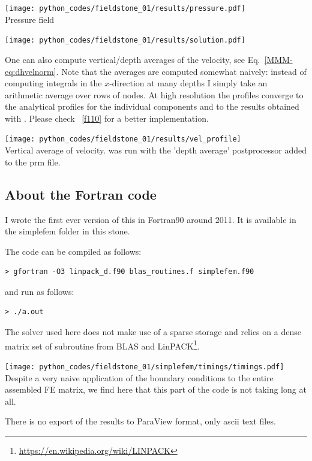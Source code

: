 \begin{center}
\texttt{[image: python\_codes/fieldstone\_01/results/pressure.pdf]}\\
{\captionfont Pressure field}
\end{center}

\begin{center}
\texttt{[image: python\_codes/fieldstone\_01/results/solution.pdf]}
\end{center}

One can also compute vertical/depth averages of the velocity, see Eq.~\eqref{MMM-eq:dhvelnorm}.
Note that the averages are computed somewhat naively: instead of computing integrals in the $x$-direction
at many depths I simply take an arithmetic average over rows of nodes. At high resolution the profiles
converge to the analytical profiles for the individual components and to the results 
obtained with \aspect. Please check \stone~\ref{f110} for a better implementation.
\begin{center}
\texttt{[image: python\_codes/fieldstone\_01/results/vel\_profile]}\\
{\captionfont Vertical average of velocity. \aspect was run with the 'depth average' postprocessor
added to the prm file.}
\end{center}

\newpage
\subsection*{About the Fortran code}

I wrote the first ever version of this \stone in
Fortran90 around 2011. It is available in the {\foldernamefont simplefem} folder in this stone.

The code can be compiled as follows:
\begin{verbatim}
> gfortran -O3 linpack_d.f90 blas_routines.f simplefem.f90
\end{verbatim}
and run as follows:
\begin{verbatim}
> ./a.out 
\end{verbatim}
The solver used here does not make use of a sparse storage and relies on a dense matrix 
set of subroutine from BLAS and LinPACK\footnote{\url{https://en.wikipedia.org/wiki/LINPACK}}.
\begin{center}
\texttt{[image: python\_codes/fieldstone\_01/simplefem/timings/timings.pdf]}\\
{\captionfont Despite a very naive application of the boundary conditions to the entire
assembled FE matrix, we find here that this part of the code is not taking long at all.}
\end{center}
There is no export of the results to ParaView format, only ascii text files.



